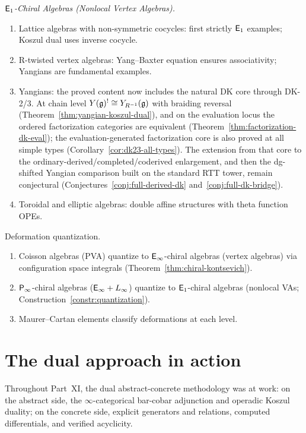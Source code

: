 \emph{$\mathsf{E}_1$-Chiral Algebras (Nonlocal Vertex Algebras).}
\begin{enumerate}[label=(\roman*)]
\item Lattice algebras with non-symmetric cocycles: first strictly $\mathsf{E}_1$ examples;
Koszul dual uses inverse cocycle.
\item R-twisted vertex algebras: Yang--Baxter equation ensures associativity;
Yangians are fundamental examples.
\item Yangians: the proved content now includes the natural DK core
  through DK-2/3.  At chain level
  $Y(\mathfrak{g})^! \cong Y_{R^{-1}}(\mathfrak{g})$ with braiding reversal
  \textup{(}Theorem~\ref{thm:yangian-koszul-dual}\textup{)}, and on the
  evaluation locus the ordered factorization categories are equivalent
  \textup{(}Theorem~\ref{thm:factorization-dk-eval}\textup{)}; the
  evaluation-generated factorization core is also proved at all simple
  types \textup{(}Corollary~\ref{cor:dk23-all-types}\textup{)}.  The
  extension from that core to the
  ordinary-derived/completed/coderived enlargement, and then the
  dg-shifted Yangian comparison built on the standard RTT tower,
  remain conjectural
  \textup{(}Conjectures~\ref{conj:full-derived-dk}
  and~\ref{conj:full-dk-bridge}\textup{)}.
\item Toroidal and elliptic algebras: double affine structures with theta function OPEs.
\end{enumerate}

Deformation quantization.
\begin{enumerate}[label=(\roman*)]
\item Coisson algebras (PVA) quantize to $\mathsf{E}_{\infty}$-chiral algebras (vertex algebras)
via configuration space integrals (Theorem~\ref{thm:chiral-kontsevich}).
\item $\mathsf{P}_{\infty}$-chiral algebras ($\mathsf{E}_{\infty} + L_\infty$) quantize to $\mathsf{E}_1$-chiral
algebras (nonlocal VAs; Construction~\ref{constr:quantization}).
\item Maurer--Cartan elements classify deformations at each level.
\end{enumerate}

\section*{The dual approach in action}

Throughout Part~XI, the dual abstract-concrete methodology was at work: on the abstract side, the $\infty$-categorical bar-cobar adjunction and operadic Koszul duality; on the concrete side, explicit generators and relations, computed differentials, and verified acyclicity.

